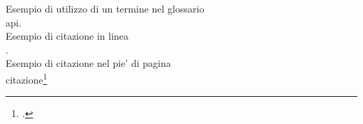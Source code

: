 \noindent Esempio di utilizzo di un termine nel glossario \\
\gls{api}. \\

\noindent Esempio di citazione in linea \\
\cite{site:agile-manifesto}. \\

\noindent Esempio di citazione nel pie' di pagina \\
citazione\footcite{womak:lean-thinking} \\